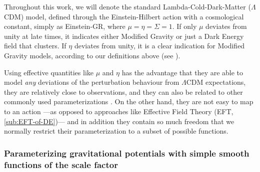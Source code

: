 Throughout this work, we will denote the standard Lambda-Cold-Dark-Matter ($\Lambda$CDM) model,
defined through the Einstein-Hilbert action with a cosmological constant, simply as Einstein-GR, where $\mu=\eta=\Sigma=1$. 
If only $\mu$ deviates from unity at late times,
it indicates either Modified Gravity or just a Dark Energy field that clusters.
If $\eta$ deviates from unity, it is a clear indication for Modified Gravity models, according to our definitions above 
(see \cite{Joyce, Lombrisier}).


Using effective quantities like $\mu$ and $\eta$ has the advantage
that they are able to model {\em any} deviations of the perturbation
behaviour from $\Lambda$CDM expectations, they are relatively close 
to observations, and they can also be related to other commonly used 
parameterizations \cite{pogosian_how_2010}.
On the other hand, they are not
easy to map to an action ---as opposed to approaches like Effective
Field Theory (EFT, \cref{sub:EFT-of-DE})---  and in addition they
contain so much freedom that we normally restrict their parameterization
to a subset of possible functions.


\subsubsection{Parameterizing gravitational potentials with simple smooth functions of the scale factor \label{sub:param-smooth-funct}}

